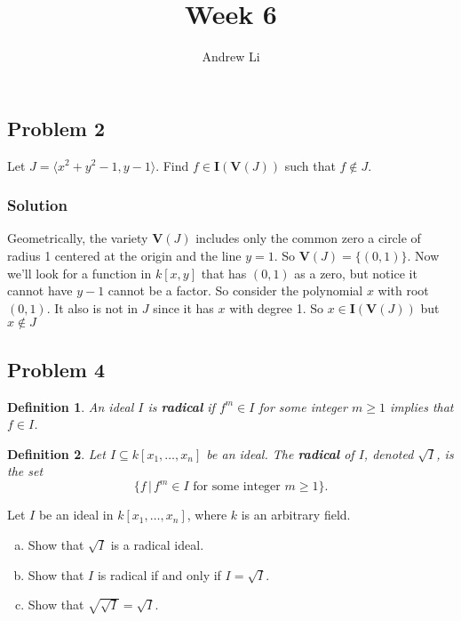 \documentclass{homework}
\title{Week 6}
\author{Andrew Li}
\newtheorem*{definition}{Definition}
\newcommand{\cg}[1]{\langle #1 \rangle}
\begin{document}
    \maketitle
    
    \setcounter{section}{4}
    \subsection{Problem 2}
    Let $J = \cg{x^2+y^2-1, y-1}$. Find $f \in \mathbf I(\mathbf V(J))$ such that $f \not\in J$.
    \subsubsection{Solution}
    Geometrically, the variety $\mathbf V(J)$ includes only the common zero a circle of radius 1 centered at the origin and the line $y = 1$. So $\mathbf V(J) = \{(0, 1)\}$. Now we'll look for a function in $k[x, y]$ that has $(0, 1)$ as a zero, but notice it cannot have $y-1$ cannot be a factor. So consider the polynomial $x$ with root $(0, 1)$. It also is not in $J$ since it has $x$ with degree 1. So $x \in \mathbf I(\mathbf V(J))$ but $x \not\in J$
    
    \setcounter{subsection}{1}
    \subsection{Problem 4}
    \begin{definition}
        An ideal $I$ is \textbf{radical} if $f^m \in I$ for some integer $m \geq 1$ implies that $f \in I$.
    \end{definition}
    \begin{definition}
        Let $I \subseteq k[x_1, \dots, x_n]$ be an ideal. The \textbf{radical} of $I$, denoted $\sqrt I$, is the set
        \[\{f \,\vert\, f^m \in I \text{ for some integer } m \geq 1\}.\]
    \end{definition}
    
    Let $I$ be an ideal in $k[x_1, \dots, x_n]$, where $k$ is an arbitrary field.
    \begin{enumerate}[(a)]
        \item Show that $\sqrt{I}$ is a radical ideal.
        \item Show that $I$ is radical if and only if $I = \sqrt{I}$.
        \item Show that $\sqrt{\sqrt{I}} = \sqrt{I}$.
    \end{enumerate}
    
\end{document}

